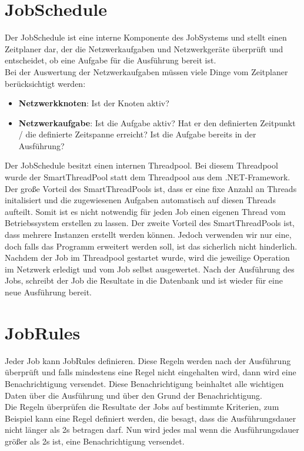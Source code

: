 \documentclass[12pt,a4paper]{report}
\begin{document}
\begin{onehalfspace}
\section{JobSchedule}

Der JobSchedule ist eine interne Komponente des JobSystems und stellt einen Zeitplaner dar, der die Netzwerkaufgaben und Netzwerkgeräte überprüft und entscheidet, ob eine Aufgabe für die Ausführung bereit ist.\\
Bei der Auswertung der Netzwerkaufgaben müssen viele Dinge vom Zeitplaner berücksichtigt werden:

\begin{itemize}
\item \textbf{Netzwerkknoten}: Ist der Knoten aktiv?
\item \textbf{Netzwerkaufgabe}: Ist die Aufgabe aktiv? Hat er den definierten Zeitpunkt / die definierte Zeitspanne erreicht? Ist die Aufgabe  bereits in der Ausführung?
\end{itemize}

Der JobSchedule besitzt einen internen Threadpool. Bei diesem Threadpool wurde der SmartThreadPool statt dem Threadpool aus dem .NET-Framework. Der große Vorteil des SmartThreadPools ist, dass er eine fixe Anzahl an Threads initalisiert und die zugewiesenen Aufgaben automatisch auf diesen Threads aufteilt. Somit ist es nicht notwendig für jeden Job einen eigenen Thread vom Betriebssystem erstellen zu lassen. Der zweite Vorteil des SmartThreadPools ist, dass mehrere Instanzen erstellt werden können. Jedoch verwenden wir nur eine, doch falls das Programm erweitert werden soll, ist das sicherlich nicht hinderlich.\\
Nachdem der Job im Threadpool gestartet wurde, wird die jeweilige Operation im Netzwerk erledigt und vom Job selbst ausgewertet. Nach der Ausführung des Jobs, schreibt der Job die Resultate in die Datenbank und ist wieder für eine neue Ausführung bereit.

\section{JobRules}

Jeder Job kann JobRules definieren. Diese Regeln werden nach der Ausführung überprüft und falls mindestens eine Regel nicht eingehalten wird, dann wird eine Benachrichtigung versendet. Diese Benachrichtigung beinhaltet alle wichtigen Daten über die Ausführung und über den Grund der Benachrichtigung.\\
Die Regeln überprüfen die Resultate der Jobs auf bestimmte Kriterien, zum Beispiel kann eine Regel definiert werden, die besagt, dass die Ausführungsdauer nicht länger als 2s betragen darf. Nun wird jedes mal wenn die Ausführungsdauer größer als 2s ist, eine Benachrichtigung versendet.


\end{onehalfspace}
\end{document}
